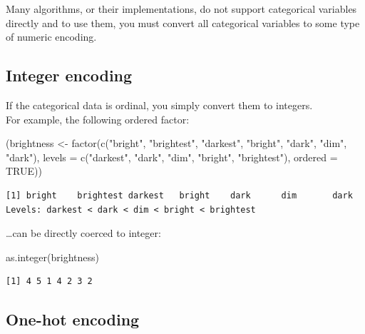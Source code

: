 \documentclass[
]{book}
\newenvironment{Shaded}{\begin{snugshade}}{\end{snugshade}}
\newcommand{\AttributeTok}[1]{\textcolor[rgb]{0.77,0.63,0.00}{#1}}
\newcommand{\ConstantTok}[1]{\textcolor[rgb]{0.00,0.00,0.00}{#1}}
\newcommand{\FunctionTok}[1]{\textcolor[rgb]{0.00,0.00,0.00}{#1}}
\newcommand{\NormalTok}[1]{#1}
\newcommand{\OtherTok}[1]{\textcolor[rgb]{0.56,0.35,0.01}{#1}}
\newcommand{\StringTok}[1]{\textcolor[rgb]{0.31,0.60,0.02}{#1}}
\begin{document}
Many algorithms, or their implementations, do not support categorical variables directly and to use them, you must convert all categorical variables to some type of numeric encoding.

\hypertarget{integer-encoding}{%
\subsection{Integer encoding}\label{integer-encoding}}

If the categorical data is ordinal, you simply convert them to integers.\\
For example, the following ordered factor:

\begin{Shaded}
\begin{Highlighting}[]
\NormalTok{(brightness }\OtherTok{\textless{}{-}} \FunctionTok{factor}\NormalTok{(}\FunctionTok{c}\NormalTok{(}\StringTok{"bright"}\NormalTok{, }\StringTok{"brightest"}\NormalTok{, }\StringTok{"darkest"}\NormalTok{,}
                    \StringTok{"bright"}\NormalTok{, }\StringTok{"dark"}\NormalTok{, }\StringTok{"dim"}\NormalTok{, }\StringTok{"dark"}\NormalTok{),}
                  \AttributeTok{levels =} \FunctionTok{c}\NormalTok{(}\StringTok{"darkest"}\NormalTok{, }\StringTok{"dark"}\NormalTok{, }\StringTok{"dim"}\NormalTok{, }\StringTok{"bright"}\NormalTok{, }\StringTok{"brightest"}\NormalTok{),}
                  \AttributeTok{ordered =} \ConstantTok{TRUE}\NormalTok{))}
\end{Highlighting}
\end{Shaded}

\begin{verbatim}
[1] bright    brightest darkest   bright    dark      dim       dark     
Levels: darkest < dark < dim < bright < brightest
\end{verbatim}

\ldots can be directly coerced to integer:

\begin{Shaded}
\begin{Highlighting}[]
\FunctionTok{as.integer}\NormalTok{(brightness)}
\end{Highlighting}
\end{Shaded}

\begin{verbatim}
[1] 4 5 1 4 2 3 2
\end{verbatim}

\hypertarget{one-hot-encoding}{%
\subsection{One-hot encoding}\label{one-hot-encoding}}
\end{document}
